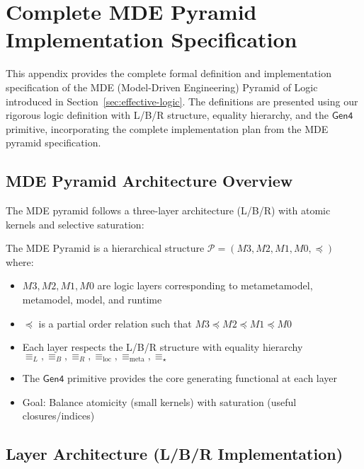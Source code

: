 \appendix
\section{Complete MDE Pyramid Implementation Specification}
\label{app:mde-pyramid}

This appendix provides the complete formal definition and implementation specification of the MDE (Model-Driven Engineering) Pyramid of Logic introduced in Section~\ref{sec:effective-logic}. The definitions are presented using our rigorous logic definition with L/B/R structure, equality hierarchy, and the $\mathsf{Gen4}$ primitive, incorporating the complete implementation plan from the MDE pyramid specification.

\subsection{MDE Pyramid Architecture Overview}

The MDE pyramid follows a three-layer architecture (L/B/R) with atomic kernels and selective saturation:

\begin{definition}
\label{def:mde-pyramid-architecture}
The MDE Pyramid is a hierarchical structure $\mathcal{P} = (M3, M2, M1, M0, \preceq)$ where:
\begin{itemize}
\item $M3, M2, M1, M0$ are logic layers corresponding to metametamodel, metamodel, model, and runtime
\item $\preceq$ is a partial order relation such that $M3 \preceq M2 \preceq M1 \preceq M0$
\item Each layer respects the L/B/R structure with equality hierarchy $\equiv_L, \equiv_B, \equiv_R, \equiv_{\text{loc}}, \equiv_{\text{meta}}, \equiv_\star$
\item The $\mathsf{Gen4}$ primitive provides the core generating functional at each layer
\item Goal: Balance atomicity (small kernels) with saturation (useful closures/indices)
\end{itemize}
\end{definition}

\subsection{Layer Architecture (L/B/R Implementation)}

